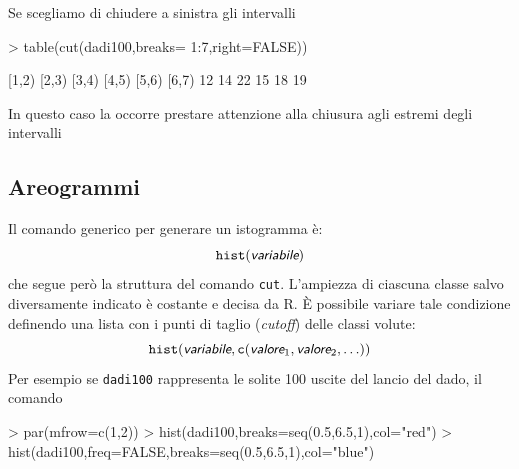 \documentclass[onecolumn,11pt]{book}
\newcommand{\varia}[1]{\textsl{\textsf{#1}}}
\begin{document}
Se scegliamo di chiudere a sinistra gli intervalli
\begin{Schunk}
\begin{Sinput}
> table(cut(dadi100,breaks= 1:7,right=FALSE))
\end{Sinput}
\begin{Soutput}
[1,2) [2,3) [3,4) [4,5) [5,6) [6,7) 
   12    14    22    15    18    19 
\end{Soutput}
\end{Schunk}
In questo caso la occorre prestare attenzione alla chiusura agli estremi degli intervalli\subsection{Areogrammi}
Il comando generico per generare un istogramma \`e:
\begin{equation*}
\texttt{hist}(\varia{variabile})
\end{equation*}
che segue per\`o la struttura del comando \texttt{cut}. L'ampiezza di ciascuna classe salvo diversamente indicato \`e costante e decisa da \textsf{R}.
\`E  possibile variare tale condizione definendo una lista con i punti di taglio ({\it cutoff}) delle classi volute:
\begin{equation} \texttt{hist}(\varia{variabile},\texttt{c}(\varia{valore}_1, \varia{valore}_2, \ldots))
\end{equation}
Per esempio se \texttt{dadi100} rappresenta le solite 100 uscite del lancio del dado, il comando 
\begin{Schunk}
\begin{Sinput}
> par(mfrow=c(1,2))
> hist(dadi100,breaks=seq(0.5,6.5,1),col="red")
> hist(dadi100,freq=FALSE,breaks=seq(0.5,6.5,1),col="blue")
\end{Sinput}
\end{Schunk}
\end{document}
